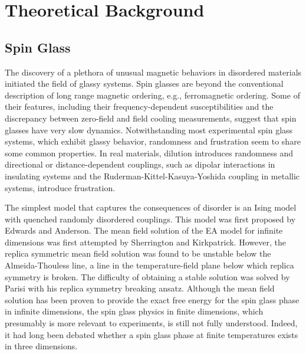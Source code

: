 \section{Theoretical Background}


\subsection{Spin Glass}

The discovery of a plethora of unusual magnetic behaviors in disordered materials 
initiated the field of glassy systems.\cite{Binder-Young1986} Spin glasses are 
beyond the conventional description of long range magnetic ordering, e.g., 
ferromagnetic ordering. Some of their features, including their frequency-dependent 
susceptibilities and the discrepancy between zero-field and field cooling measurements, 
suggest that spin glasses have very slow dynamics. Notwithstanding most experimental spin 
glass systems, which exhibit glassy behavior, randomness and frustration 
seem to share some common properties. In real materials, 
dilution introduces randomness and directional or distance-dependent couplings, 
such as dipolar interactions in insulating systems and the Ruderman-Kittel-Kasuya-Yoshida 
coupling in metallic systems, introduce frustration. 

The simplest model that captures the consequences of disorder is an Ising model 
with quenched randomly disordered couplings. This model was first proposed by Edwards 
and Anderson. \cite{Edwards-Anderson1975} The mean field solution of the EA 
model for infinite dimensions was first attempted by Sherrington and Kirkpatrick. 
\cite{Sherrington-Kirkpatrick1978} However, the replica symmetric mean field solution was found to be 
unstable below the Almeida-Thouless line, \cite{Almedia-Thouless1978,Bray-Moore-1978}
a line in the temperature-field plane below which replica symmetry is broken. The difficulty 
of obtaining a stable solution was solved by Parisi with his replica symmetry breaking 
ansatz. \cite{Parisi-1979,Mezard-etal-1984,Parisi-1980a,Parisi-1980b,Parisi-1980c,Parisi-dirac-medal-2002} 
Although the mean field solution has been proven to provide the exact free energy for the spin glass phase 
in infinite dimensions, \cite{Talagrand-2006,Guerra-2003} the spin glass 
physics in finite dimensions, which presumably is more relevant to experiments, is 
still not fully understood. Indeed, it had long been debated whether a spin glass 
phase at finite temperatures exists in three dimensions.

